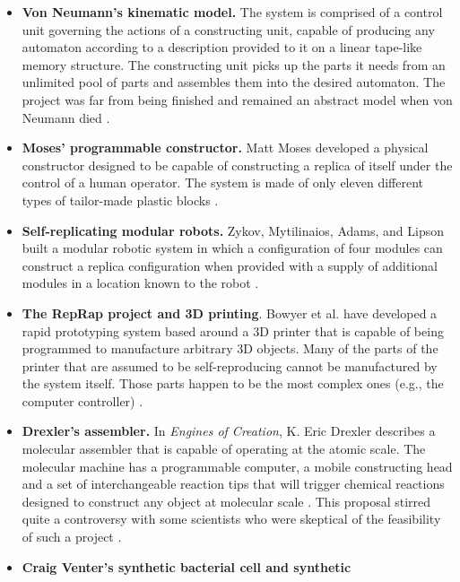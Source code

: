 \begin{itemize}
\item \textbf{Von Neumann’s kinematic model.} The system is comprised of a
control unit governing the actions of a constructing unit, capable of
producing any automaton according to a description provided to it on a
linear tape-like memory structure. The constructing unit picks up the
parts it needs from an unlimited pool of parts and assembles them into
the desired automaton. The project was far from being finished and
remained an abstract model when von Neumann died \citep{stevens2009}.
\item \textbf{Moses' programmable constructor.} Matt Moses developed a physical constructor designed to be
capable of constructing a replica of itself under the control of a
human operator. The system is made of only eleven different types of
tailor-made plastic blocks \citep{moses2001}.
\item \textbf{Self-replicating modular robots.} Zykov, Mytilinaios,
Adams, and Lipson built a modular robotic system in which a
configuration of four modules can construct a replica configuration
when provided with a supply of additional modules in a location known
to the robot .
\item \textbf{The RepRap project and 3D printing}. Bowyer et al. have
developed a rapid prototyping system based around a 3D printer that is
capable of being programmed to manufacture arbitrary 3D objects. Many
of the parts of the printer that are assumed to be self-reproducing
cannot be manufactured by the system itself.  Those parts happen to be the
most complex ones (e.g., the computer controller) \citep{bowyer2007}.
\item \textbf{Drexler's assembler.} In \textit{Engines of Creation}, K. Eric
Drexler describes a molecular assembler that is capable of operating at
the atomic scale. The molecular machine has a programmable computer, a
mobile constructing head and a set of interchangeable reaction tips
that will trigger chemical reactions designed to construct any object
at molecular scale \citep{drexler1986}.
This proposal stirred quite a controversy with some
scientists who were skeptical of the feasibility of such a project \citep{smalley2001}.
\item \textbf{Craig Venter's synthetic bacterial cell and synthetic
}
\end{itemize}
